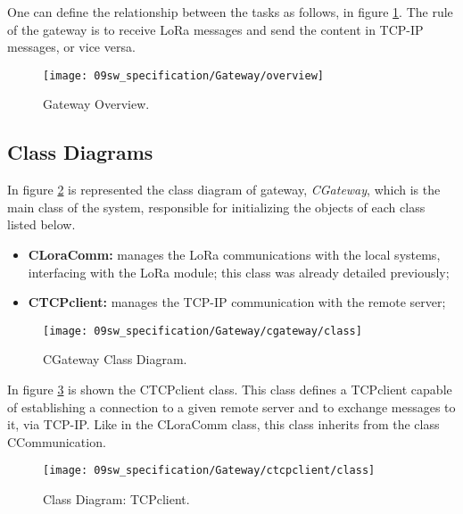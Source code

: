 One can define the relationship between the tasks as follows, in figure \ref{fig:GwOverview}. The rule of the gateway is to receive LoRa messages and send the content in TCP-IP messages, or vice versa.

\begin{figure}[H]
	\centering
	\texttt{[image: 09sw\_specification/Gateway/overview]}
	\caption{Gateway Overview.}
	\label{fig:GwOverview}
\end{figure}

\subsection{Class Diagrams}
In figure \ref{fig:GwclassDiag} is represented the class diagram of gateway, \textit{CGateway}, which is the main class of the system, responsible for initializing the objects of each class listed below.

\begin{itemize}
	\item \textbf{CLoraComm:} manages the LoRa communications with the local systems, interfacing with the LoRa module; this class was already detailed previously;
	
	\item \textbf{CTCPclient:} manages the TCP-IP communication with the remote server;
\end{itemize}

\begin{figure}[H]
	\centering	\texttt{[image: 09sw\_specification/Gateway/cgateway/class]}
	\caption{CGateway Class Diagram.}
	\label{fig:GwclassDiag}
\end{figure}


In figure \ref{fig:TCPclientClass} is shown the CTCPclient class. This class defines a TCPclient capable of establishing a connection to a given remote server and to exchange messages to it, via TCP-IP. Like in the CLoraComm class, this class inherits from the class CCommunication.

\begin{figure}[H]
	\centering
	\texttt{[image: 09sw\_specification/Gateway/ctcpclient/class]}
	\caption{Class Diagram: TCPclient.}
	\label{fig:TCPclientClass}
\end{figure}

\clearpage
